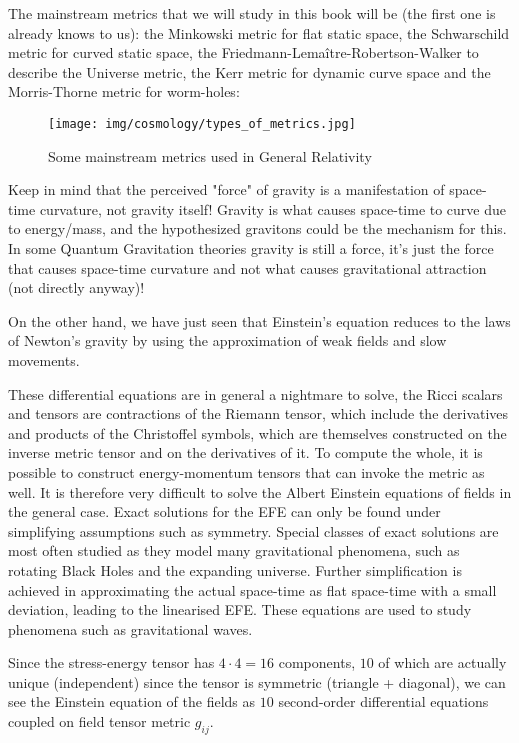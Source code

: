 	The mainstream metrics that we will study in this book will be (the first one is already knows to us): the Minkowski metric for flat static space, the Schwarschild metric for curved static space, the Friedmann-Lemaître-Robertson-Walker to describe the Universe metric, the Kerr metric for dynamic curve space and the Morris-Thorne metric for worm-holes:
	\begin{figure}[H]
		\centering
		\texttt{[image: img/cosmology/types\_of\_metrics.jpg]}	
		\caption[Some mainstream metrics used in General Relativity]{Some mainstream metrics used in General Relativity}
	\end{figure} 
	\begin{tcolorbox}[title=Remark,colframe=black,arc=10pt]
	Keep in mind that the perceived "force" of gravity is a manifestation of space-time curvature, not gravity itself! Gravity is what causes space-time to curve due to energy/mass, and the hypothesized gravitons could be the mechanism for this. In some Quantum Gravitation theories gravity is still a force, it's just the force that causes space-time curvature and not what causes gravitational attraction (not directly anyway)!
	\end{tcolorbox}
	On the other hand, we have just seen that Einstein's equation reduces to the laws of Newton's gravity by using the approximation of weak fields and slow movements. 
	
	These differential equations are in general a nightmare to solve, the Ricci scalars and tensors are contractions of the Riemann tensor, which include the derivatives and products of the Christoffel symbols, which are themselves constructed on the inverse metric tensor and on the derivatives of it. To compute the whole, it is possible to construct energy-momentum tensors that can invoke the metric as well. It is therefore very difficult to solve the Albert Einstein equations of fields in the general case. Exact solutions for the EFE can only be found under simplifying assumptions such as symmetry. Special classes of exact solutions are most often studied as they model many gravitational phenomena, such as rotating Black Holes and the expanding universe. Further simplification is achieved in approximating the actual space-time as flat space-time with a small deviation, leading to the linearised EFE. These equations are used to study phenomena such as gravitational waves.

	Since the stress-energy tensor has $4\cdot 4=16$ components, $10$ of which are actually unique (independent) since the tensor is symmetric (triangle + diagonal), we can see the Einstein equation of the fields as $10$ second-order differential equations coupled on field tensor metric $g_{ij}$.
	

